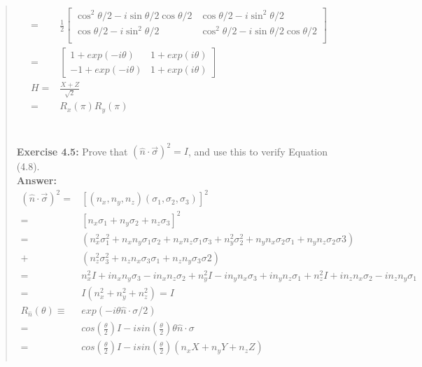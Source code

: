 \documentclass[UTF8]{ctexart}
\begin{document}
\begin{quote}
\begin{equation}
\begin{aligned}
		=&\frac{1}{2}\begin{bmatrix}
			\cos^{2}{\theta/2} -i\sin{\theta/2}\cos{\theta/2} &\cos{\theta/2} -i\sin^{2}{\theta/2}\\
			\cos{\theta/2} -i\sin^{2}{\theta/2} &\cos^{2}{\theta/2} -i\sin{\theta/2}\cos{\theta/2} \\
		\end{bmatrix}
		\\
		=&\begin{bmatrix}
			1+exp(-i\theta) &1+exp(i\theta) \\
			-1+exp(-i\theta) &1+exp(i\theta)
		\end{bmatrix} \\
		H=&\frac{X+Z}{\sqrt{2}}\\
		 =&R_{x}(\pi)R_{y}(\pi)
	\end{aligned}
\end{equation}
	\\
	\\
\textbf{Exercise 4.5: } Prove that $ (\hat{n}\cdot \vec{\sigma})^{2} = I$, and use this to verify Equation (4.8).
\\
\textbf{Answer:}\\
\begin{equation}
	\begin{aligned}
		(\hat{n}\cdot \vec{\sigma})^{2}=&\left[(n_{x},n_{y},n_{z})(\sigma_{1},\sigma_{2},\sigma_{3})\right]^{2}\\
					=&\left[n_{x}\sigma_{1}+n_{y}\sigma_{2}+n_{z}\sigma_{3}\right]^{2} \\
					=&\left(n_{x}^{2}\sigma_{1}^{2}+n_{x}n_{y}\sigma_{1}\sigma_{2}+n_{x}n_{z}\sigma_{1}\sigma_{3}
					+n_{y}^{2}\sigma_{2}^{2}+n_{y}n_{x}\sigma_{2}\sigma_{1}+n_{y}n_{z}\sigma_{2}\sigma{3} 
					\right)\\
					+&\left(n_{z}^{2}\sigma_{3}^{2}+n_{z}n_{x}\sigma_{3}\sigma_{1}+n_{z}n_{y}\sigma_{3}\sigma{2}
					\right)\\
					=&n_{x}^{2}I+in_{x}n_{y}\sigma_{3}-in_{x}n_{z}\sigma_{2}+n_{y}^{2}I-in_{y}n_{x}\sigma_{3}
					+in_{y}n_{z}\sigma_{1}+n_{z}^{2}I+in_{z}n_{x}\sigma_{2}-in_{z}n_{y}\sigma_{1}\\
					=&I(n_{x}^{2}+n_{y}^{2}+n_{z}^{2})=I\\
				R_{\hat{n}}(\theta)\equiv &exp(-i\theta\hat{n}\cdot\sigma/2) \\
				=&cos(\frac{\theta}{2})I-isin(\frac{\theta}{2})\theta\hat{n}\cdot\sigma\\
				=&cos(\frac{\theta}{2})I-isin(\frac{\theta}{2})(n_{x}X+n_{y}Y+n_{z}Z) \\

\end{aligned}
\end{equation}
\end{quote}
\end{document}
